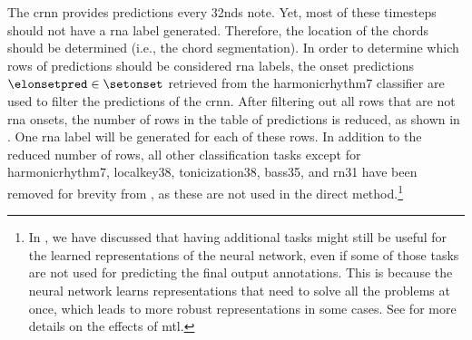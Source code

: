 
The \gls{crnn} provides predictions every \glspl{32nd} note.
Yet, most of these timesteps should not have a \gls{rna}
label generated. Therefore, the location of the chords
should be determined (i.e., the chord segmentation). In
order to determine which rows of predictions should be
considered \gls{rna} labels, the onset predictions
$\elonsetpred \in \setonset$ retrieved from the
\gls{harmonicrhythm7} classifier are used to filter the
predictions of the \gls{crnn}. After filtering out all rows
that are not \gls{rna} onsets, the number of rows in the
table of predictions is reduced, as shown in
. One \gls{rna} label
will be generated for each of these rows. In addition to the
reduced number of rows, all other classification tasks
except for \gls{harmonicrhythm7}, \gls{localkey38},
\gls{tonicization38}, \gls{bass35}, and \gls{rn31} have been
removed for brevity from
, as these are not used
in the direct method.\footnote{In
\textcite{napoleslopez2021augmentednet}, we have discussed
that having additional tasks might still be useful for the
learned representations of the neural network, even if some
of those tasks are not used for predicting the final output
annotations. This is because the neural network learns
representations that need to solve all the problems at once,
which leads to more robust representations in some cases.
See \textcite{ruder2017overview} for more details on the
effects of \gls{mtl}.}

